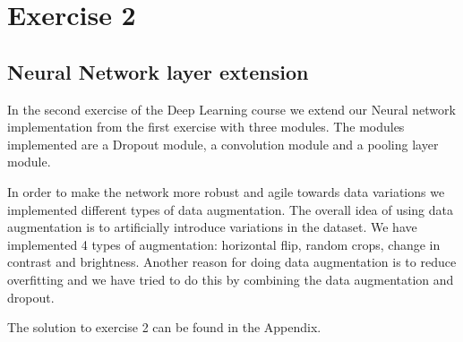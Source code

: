 \graphicspath{{Chapters/Exercise2/}}

\chapter{Exercise 2}

\section{Neural Network layer extension} %
\label{sec:Neural_Network_layer_extension}

In the second exercise of the Deep Learning course we extend our Neural
network implementation from the first exercise with three modules. The modules
implemented are a Dropout module, a convolution module and a pooling layer
module. 

In order to make the network more robust and agile towards data variations we
implemented different types of data augmentation. The overall idea of using data
augmentation is to artificially introduce variations in the dataset. We have
implemented 4 types of augmentation: horizontal flip, random crops, change in
contrast and brightness. Another reason for doing data augmentation is to
reduce overfitting and we have tried to do this by combining the data
augmentation and dropout. 


The solution to exercise 2 can be found in the Appendix. 
 


